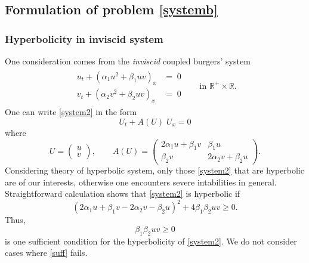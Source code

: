 \documentclass{amsart}
\def\blue{\color{blue}}
\theoremstyle{definition}
\numberwithin{equation}{section}
\begin{document}



\subsection{Formulation of problem \eqref{systemb}}

\subsubsection{Hyperbolicity in inviscid system}

One consideration comes from the {\it inviscid} coupled burgers' system
\begin{align}\label{system2} 
\begin{aligned}
u_{t} + ( \alpha_{1}u^{2} + \beta_{1}uv )_{x} &= \; 0 \\
v_{t} + ( \alpha_{2}v^{2} + \beta_{2}uv )_{x} &= \; 0 
\end{aligned} \quad &\text{in $\mathbb{R}^+\times \mathbb{R}$}.
\end{align}
One can write \eqref{system2} in the form
\begin{equation*}%
U_{t} +
A(U) \; U_{x}=0
\end{equation*}
where
\begin{equation*}
U = \begin{pmatrix}
u \\
v
\end{pmatrix}, \quad \quad
A(U) =
\begin{pmatrix}
2\alpha_{1}u+\beta_{1}v & \beta_{1}u \\
\beta_{2}v & 2\alpha_{2}v + \beta_{2}u
\end{pmatrix}.
\end{equation*}
Considering theory of hyperbolic system, only those \eqref{system2} that are hyperbolic are of our interests, otherwise one encounters severe intabilities in general. Straightforward calculation shows that \eqref{system2} is hyperbolic if
$$ (2\alpha_1u + \beta_1v - 2\alpha_2v - \beta_2u)^2 + 4 \beta_1\beta_2uv \ge 0.$$
Thus, 
\begin{equation} \label{suff} \tag{S}
\beta_1\beta_2uv \ge 0 
\end{equation}
is one sufficient condition for the hyperbolicity of \eqref{system2}. We do not consider cases where \eqref{suff} fails.
\end{document}
